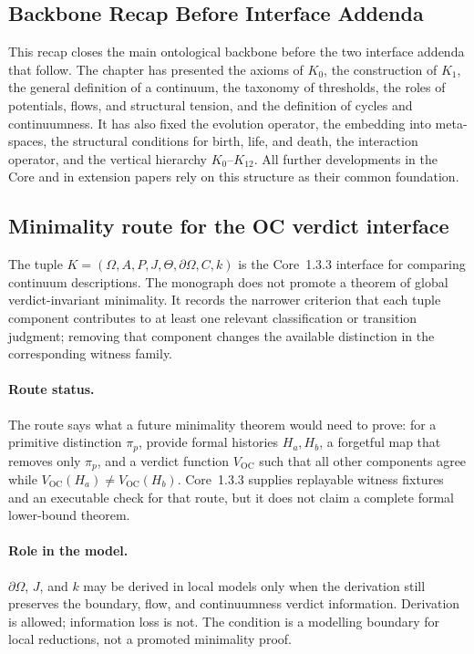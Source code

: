 \subsection{Backbone Recap Before Interface Addenda}

This recap closes the main ontological backbone before the two interface
addenda that follow. The chapter has presented
the axioms of \(K_0\), the construction of \(K_1\), the general definition of a continuum,
the taxonomy of thresholds, the roles of potentials, flows, and structural tension,
and the definition of cycles and continuumness.
It has also fixed the evolution operator, the embedding into meta-spaces, the
structural conditions for birth, life, and death, the interaction operator, and
the vertical hierarchy \(K_0\)--\(K_{12}\).
All further developments in the Core and in extension papers rely on this structure as their common foundation.


\subsection{Minimality route for the OC verdict interface}
\label{sec:oc13-global-verdict-minimality}

The tuple \(K=(\Omega,A,P,J,\Theta,\partial\Omega,C,k)\) is the Core~1.3.3
interface for comparing continuum descriptions. The monograph does not promote
a theorem of global verdict-invariant minimality. It records the narrower
criterion that each tuple component contributes to at least one relevant
classification or transition judgment; removing that component changes the
available distinction in the corresponding witness family.

\paragraph{Route status.}
The route says what a future minimality theorem would need to prove: for a
primitive distinction \(\pi_p\), provide formal histories \(H_a,H_b\), a
forgetful map that removes only \(\pi_p\), and a verdict function
\(V_{\mathrm{OC}}\) such that all other components agree while
\(V_{\mathrm{OC}}(H_a)\neq V_{\mathrm{OC}}(H_b)\).  Core~1.3.3 supplies
replayable witness fixtures and an executable check for that
route, but it does not claim a complete formal lower-bound theorem.

\paragraph{Role in the model.}
\(\partial\Omega\), \(J\), and \(k\) may be derived in local models only when
the derivation still preserves the boundary, flow, and continuumness verdict
information. Derivation is allowed; information loss is not. The condition is a
modelling boundary for local reductions, not a promoted minimality proof.

